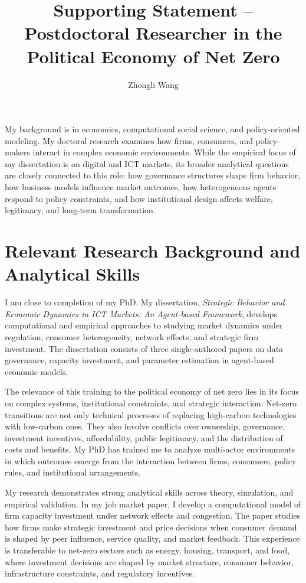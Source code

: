 \documentclass{nfr}
\title{Supporting Statement -- Postdoctoral Researcher in the Political Economy of Net Zero}
\author{Zhongli Wang}
\begin{document}
\maketitle

My background is in economics, computational social science, and policy-oriented modeling. My doctoral research examines how firms, consumers, and policy-makers interact in complex economic environments. While the empirical focus of my dissertation is on digital and ICT markets, its broader analytical questions are closely connected to this role: how governance structures shape firm behavior, how business models influence market outcomes, how heterogeneous agents respond to policy constraints, and how institutional design affects welfare, legitimacy, and long-term transformation.

\section*{Relevant Research Background and Analytical Skills}

I am close to completion of my PhD. My dissertation, \textit{Strategic Behavior and Economic Dynamics in ICT Markets: An Agent-based Framework}, develops computational and empirical approaches to studying market dynamics under regulation, consumer heterogeneity, network effects, and strategic firm investment. The dissertation consists of three single-authored papers on data governance, capacity investment, and parameter estimation in agent-based economic models.

The relevance of this training to the political economy of net zero lies in its focus on complex systems, institutional constraints, and strategic interaction. Net-zero transitions are not only technical processes of replacing high-carbon technologies with low-carbon ones. They also involve conflicts over ownership, governance, investment incentives, affordability, public legitimacy, and the distribution of costs and benefits. My PhD has trained me to analyze multi-actor environments in which outcomes emerge from the interaction between firms, consumers, policy rules, and institutional arrangements.

My research demonstrates strong analytical skills across theory, simulation, and empirical validation. In my job market paper, I develop a computational model of firm capacity investment under network effects and congestion. The paper studies how firms make strategic investment and price decisions when consumer demand is shaped by peer influence, service quality, and market feedback. This experience is transferable to net-zero sectors such as energy, housing, transport, and food, where investment decisions are shaped by market structure, consumer behavior, infrastructure constraints, and regulatory incentives.
\end{document}

